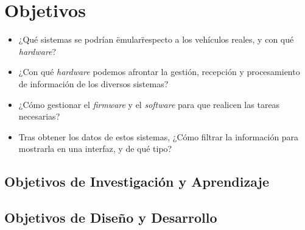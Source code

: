 \section{Objetivos}



\begin{itemize}
    \item ¿Qué sistemas se podrían \"emular\" respecto a los vehículos reales, y con qué \textit{hardware}?
    \item ¿Con qué \textit{hardware} podemos afrontar la gestión, recepción y procesamiento de información de los diversos sistemas?
    \item ¿Cómo gestionar el \textit{firmware} y el \textit{software} para que realicen las tareas necesarias?
    \item Tras obtener los datos de estos sistemas, ¿Cómo filtrar la información para mostrarla en una interfaz, y de qué tipo?
\end{itemize}

\subsection{Objetivos de Investigación y Aprendizaje}
\subsection{Objetivos de Diseño y Desarrollo}
